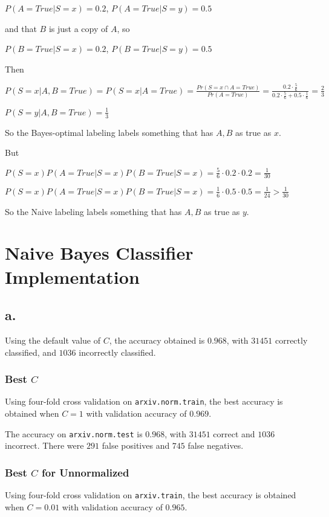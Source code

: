\documentclass[]{article}
\begin{document}
$P(A=True|S=x) = 0.2$, $P(A=True|S=y) = 0.5$

and that $B$ is just a copy of $A$, so

$P(B=True|S=x) = 0.2$, $P(B=True|S=y) = 0.5$

Then

$P(S=x|A,B=True) = P(S=x|A=True) = \frac{Pr(S=x \cap A=True)}{Pr(A=True)} = \frac{0.2 \cdot \frac{5}{6}}{0.2 \cdot \frac{5}{6} + 0.5 \cdot \frac{1}{6}} = \frac{2}{3}$

$P(S=y|A,B=True) = \frac{1}{3}$

So the Bayes-optimal labeling labels something that has $A,B$ as true as $x$.

But

$P(S=x)P(A=True|S=x)P(B=True|S=x) = \frac{5}{6} \cdot 0.2 \cdot 0.2 = \frac{1}{30}$

$P(S=x)P(A=True|S=x)P(B=True|S=x) = \frac{1}{6} \cdot 0.5 \cdot 0.5 = \frac{1}{24} > \frac{1}{30}$

So the Naive labeling labels something that has $A,B$ as true as $y$.

\section{Naive Bayes Classifier Implementation}
\subsection*{a.}
Using the default value of $C$, the accuracy obtained is $0.968$, with $31451$ correctly classified, and $1036$ incorrectly classified.

\subsubsection{Best $C$}
Using four-fold cross validation on \texttt{arxiv.norm.train}, the best accuracy is obtained when $C=1$ with validation accuracy of $0.969$.

The accuracy on \texttt{arxiv.norm.test} is $0.968$, with $31451$ correct and $1036$ incorrect. There were $291$ false positives and $745$ false negatives.

\subsubsection{Best $C$ for Unnormalized}
Using four-fold cross validation on \texttt{arxiv.train}, the best accuracy is obtained when $C=0.01$ with validation accuracy of $0.965$.
\end{document}
